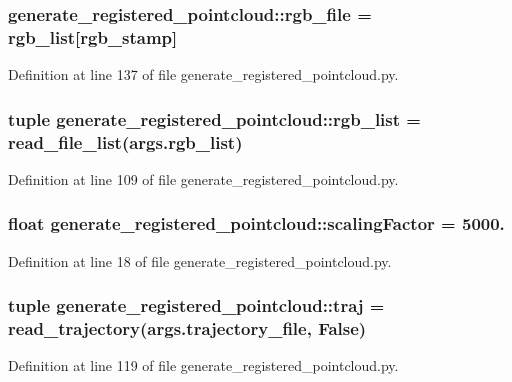 \subsubsection[{rgb\-\_\-file}]{ {\bf generate\-\_\-registered\-\_\-pointcloud\-::rgb\-\_\-file} = {\bf rgb\-\_\-list}[rgb\-\_\-stamp]}\label{namespacegenerate__registered__pointcloud_a34546341d79f3e123112c257f59d49b8}


\-Definition at line 137 of file generate\-\_\-registered\-\_\-pointcloud.\-py.

\subsubsection[{rgb\-\_\-list}]{\setlength{\rightskip}{0pt plus 5cm}tuple {\bf generate\-\_\-registered\-\_\-pointcloud\-::rgb\-\_\-list} = read\-\_\-file\-\_\-list(args.\-rgb\-\_\-list)}\label{namespacegenerate__registered__pointcloud_a8bfbddf494d0a81c82da7ec2d93041c9}


\-Definition at line 109 of file generate\-\_\-registered\-\_\-pointcloud.\-py.

\subsubsection[{scaling\-Factor}]{\setlength{\rightskip}{0pt plus 5cm}float {\bf generate\-\_\-registered\-\_\-pointcloud\-::scaling\-Factor} = 5000.}\label{namespacegenerate__registered__pointcloud_a0286afb74dad714d78360ba7e23bfb77}


\-Definition at line 18 of file generate\-\_\-registered\-\_\-pointcloud.\-py.

\subsubsection[{traj}]{\setlength{\rightskip}{0pt plus 5cm}tuple {\bf generate\-\_\-registered\-\_\-pointcloud\-::traj} = read\-\_\-trajectory(args.\-trajectory\-\_\-file, \-False)}\label{namespacegenerate__registered__pointcloud_a1bf45926a03c5442ac0756c6f0cf6b87}


\-Definition at line 119 of file generate\-\_\-registered\-\_\-pointcloud.\-py.

